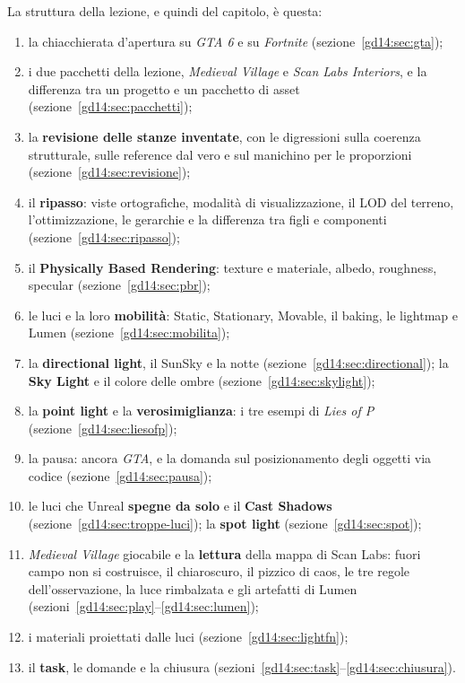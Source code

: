La struttura della lezione, e quindi del capitolo, è questa:
\begin{enumerate}
  \item la chiacchierata d'apertura su \emph{GTA 6} e su \emph{Fortnite}
        (sezione~\ref{gd14:sec:gta});
  \item i due pacchetti della lezione, \emph{Medieval Village} e \emph{Scan Labs
        Interiors}, e la differenza tra un progetto e un pacchetto di asset
        (sezione~\ref{gd14:sec:pacchetti});
  \item la \textbf{revisione delle stanze inventate}, con le digressioni sulla
        coerenza strutturale, sulle reference dal vero e sul manichino per le
        proporzioni (sezione~\ref{gd14:sec:revisione});
  \item il \textbf{ripasso}: viste ortografiche, modalità di visualizzazione,
        il LOD del terreno, l'ottimizzazione, le gerarchie e la differenza tra
        figli e componenti (sezione~\ref{gd14:sec:ripasso});
  \item il \textbf{Physically Based Rendering}: texture e materiale, albedo,
        roughness, specular (sezione~\ref{gd14:sec:pbr});
  \item le luci e la loro \textbf{mobilità}: Static, Stationary, Movable, il
        baking, le lightmap e Lumen (sezione~\ref{gd14:sec:mobilita});
  \item la \textbf{directional light}, il SunSky e la notte
        (sezione~\ref{gd14:sec:directional}); la \textbf{Sky Light} e il colore
        delle ombre (sezione~\ref{gd14:sec:skylight});
  \item la \textbf{point light} e la \textbf{verosimiglianza}: i tre esempi di
        \emph{Lies of P} (sezione~\ref{gd14:sec:liesofp});
  \item la pausa: ancora \emph{GTA}, e la domanda sul posizionamento degli
        oggetti via codice (sezione~\ref{gd14:sec:pausa});
  \item le luci che Unreal \textbf{spegne da solo} e il \textbf{Cast Shadows}
        (sezione~\ref{gd14:sec:troppe-luci}); la \textbf{spot light}
        (sezione~\ref{gd14:sec:spot});
  \item \emph{Medieval Village} giocabile e la \textbf{lettura} della mappa di
        Scan Labs: fuori campo non si costruisce, il chiaroscuro, il pizzico di
        caos, le tre regole dell'osservazione, la luce rimbalzata e gli
        artefatti di Lumen (sezioni~\ref{gd14:sec:play}--\ref{gd14:sec:lumen});
  \item i materiali proiettati dalle luci (sezione~\ref{gd14:sec:lightfn});
  \item il \textbf{task}, le domande e la chiusura
        (sezioni~\ref{gd14:sec:task}--\ref{gd14:sec:chiusura}).
\end{enumerate}

